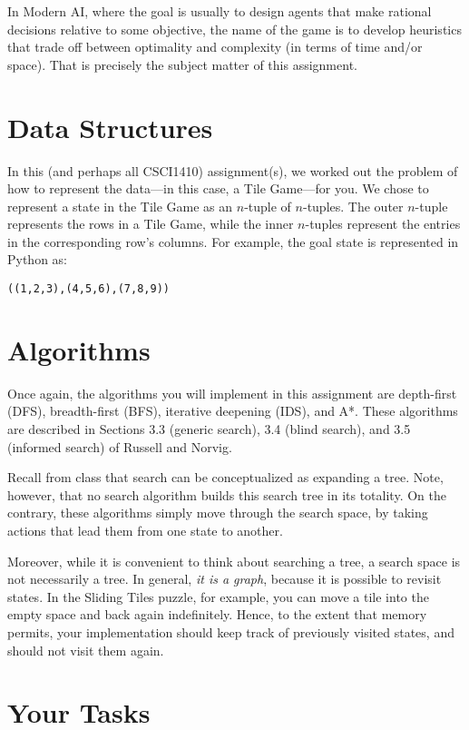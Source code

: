 \documentclass{article}
\begin{document}
In Modern AI, where the goal is usually to design agents that make
rational decisions relative to some objective, the name of the game is
to develop heuristics that trade off between optimality and complexity
(in terms of time and/or space).  That is precisely the subject matter
of this assignment.


\section{Data Structures}

In this (and perhaps all CSCI1410) assignment(s), we worked out the
problem of how to represent the data---in this case, a Tile Game---for
you.  We chose to represent a state in the Tile Game as an $n$-tuple
of $n$-tuples.  The outer $n$-tuple represents the rows in a Tile
Game, while the inner $n$-tuples represent the entries in the
corresponding row's columns.  For example, the goal state is
represented in Python as:
\begin{center}
\verb|((1,2,3),(4,5,6),(7,8,9))|
\end{center}


\section{Algorithms}

Once again, the algorithms you will implement in this assignment are
depth-first (DFS), breadth-first (BFS), iterative deepening (IDS), and A*.
These algorithms are described in Sections 3.3 (generic search), 3.4 (blind
search), and 3.5 (informed search) of Russell and Norvig.

Recall from class that search can be conceptualized as expanding a tree.
Note, however, that no search algorithm builds this search tree in its totality.
On the contrary, these algorithms simply move through the search space,
by taking actions that lead them from one state to another.

Moreover, while it is convenient to think about searching a tree, a
search space is not necessarily a tree.  In general, \emph{it is a
  graph}, because it is possible to revisit states.  In the Sliding
Tiles puzzle, for example, you can move a tile into the empty space
and back again indefinitely.  Hence, to the extent that memory
permits, your implementation should keep track of previously visited
states, and should not visit them again.

\section{Your Tasks}
\end{document}
